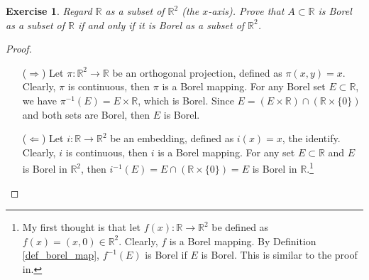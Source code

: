 \documentclass[11pt]{book}
\newtheorem{exercise}{Exercise}[section]
\theoremstyle{definition}
\numberwithin{equation}{chapter}
\begin{document}
\begin{exercise}\label{exe_120}
Regard $\mathbb{R}$ as a subset of $\mathbb{R}^2$ (the $x$-axis). Prove that $A\subset\mathbb{R}$ is Borel as a subset of $\mathbb{R}$ if and only if it is Borel as a subset of $\mathbb{R}^2$.
\end{exercise}
\begin{proof}
~\begin{enumerate}
    \item[($\Rightarrow$)] Let $\pi:\mathbb{R}^2 \to \mathbb{R}$ be an orthogonal projection, defined as $\pi(x,y) = x$. Clearly, $\pi$ is continuous, then $\pi$ is a Borel mapping. For any Borel set $E \subset \mathbb{R}$, we have $\pi^{-1}(E) = E \times \mathbb{R}$, which is Borel. Since $E = (E \times \mathbb{R}) \cap (\mathbb{R} \times \{0\})$ and both sets are Borel, then $E$ is Borel.
    
    \item[($\Leftarrow$)] Let $i:\mathbb{R} \to \mathbb{R}^2$ be an embedding, defined as $i(x) = x$, the identify. Clearly, $i$ is continuous, then $i$ is a Borel mapping. For any set $E \subset \mathbb{R}$ and $E$ is Borel in $\mathbb{R}^2$, then $i^{-1}(E) = E \cap (\mathbb{R} \times \{0\}) = E$ is Borel in $\mathbb{R}$.\footnote{My first thought is that let $f(x): \mathbb{R} \to \mathbb{R}^2$ be defined as $f(x) = (x,0) \in \mathbb{R}^2$. Clearly, $f$ is a Borel mapping. By Definition \ref{def_borel_map}, $f^{-1}(E)$ is Borel if $E$ is Borel. This is similar to the proof in\cite{23}.}
\end{enumerate}
\end{proof}
\end{document}
